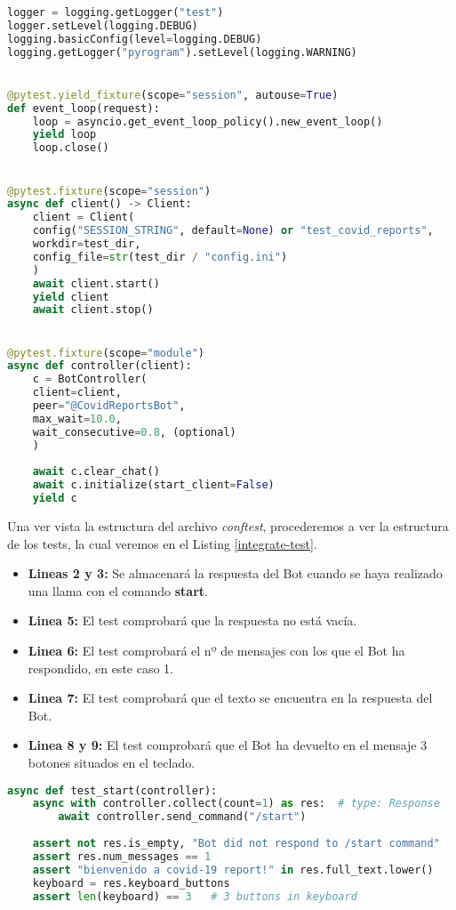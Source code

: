 \begin{lstlisting}[language=Python, caption={Contenido del archivo conftest.}, label={lst:conftest}]
logger = logging.getLogger("test")
logger.setLevel(logging.DEBUG)
logging.basicConfig(level=logging.DEBUG)
logging.getLogger("pyrogram").setLevel(logging.WARNING)


@pytest.yield_fixture(scope="session", autouse=True)
def event_loop(request):
	loop = asyncio.get_event_loop_policy().new_event_loop()
	yield loop
	loop.close()


@pytest.fixture(scope="session")
async def client() -> Client:
	client = Client(
	config("SESSION_STRING", default=None) or "test_covid_reports",
	workdir=test_dir,
	config_file=str(test_dir / "config.ini")
	)
	await client.start()
	yield client
	await client.stop()


@pytest.fixture(scope="module")
async def controller(client):
	c = BotController(
	client=client,
	peer="@CovidReportsBot",
	max_wait=10.0,
	wait_consecutive=0.8, (optional)
	)
	
	await c.clear_chat()
	await c.initialize(start_client=False)
	yield c
\end{lstlisting}

Una ver vista la estructura del archivo \textit{conftest}, procederemos a ver la estructura de los tests, la cual veremos en el Listing \ref{integrate-test}.

\begin{itemize}
	\item \textbf{Lineas 2 y 3:} Se almacenará la respuesta del Bot cuando se haya realizado una llama con el comando \textbf{start}.
	\item \textbf{Linea 5:} El test comprobará que la respuesta no está vacía.
	\item \textbf{Linea 6:} El test comprobará el nº de mensajes con los que el Bot ha respondido, en este caso 1.
	\item \textbf{Linea 7:} El test comprobará que el texto se encuentra en la respuesta del Bot.
	\item \textbf{Linea 8 y 9:} El test comprobará que el Bot ha devuelto en el mensaje 3 botones situados en el teclado.
\end{itemize}


\begin{lstlisting}[language=Python, caption={Ejemplo de test integrado.}, label={lst:integrate-test}]
async def test_start(controller):
	async with controller.collect(count=1) as res:  # type: Response
		await controller.send_command("/start")
	
	assert not res.is_empty, "Bot did not respond to /start command"
	assert res.num_messages == 1
	assert "bienvenido a covid-19 report!" in res.full_text.lower()
	keyboard = res.keyboard_buttons
	assert len(keyboard) == 3   # 3 buttons in keyboard
\end{lstlisting}

